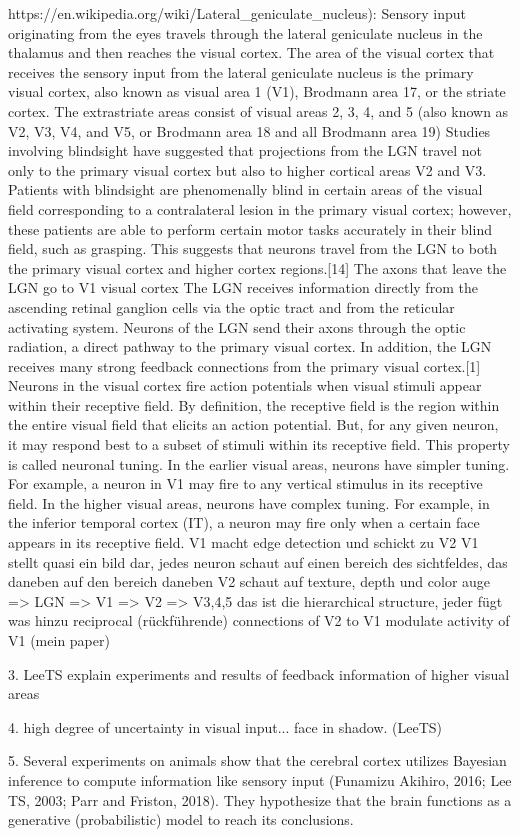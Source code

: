 https://en.wikipedia.org/wiki/Lateral_geniculate_nucleus):
 Sensory input originating from the eyes travels through the lateral geniculate nucleus in the thalamus and then reaches the visual cortex. The area of the visual cortex that receives the sensory input from the lateral geniculate nucleus is the primary visual cortex, also known as visual area 1 (V1), Brodmann area 17, or the striate cortex. The extrastriate areas consist of visual areas 2, 3, 4, and 5 (also known as V2, V3, V4, and V5, or Brodmann area 18 and all Brodmann area 19)
 Studies involving blindsight have suggested that projections from the LGN travel not only to the primary visual cortex but also to higher cortical areas V2 and V3. Patients with blindsight are phenomenally blind in certain areas of the visual field corresponding to a contralateral lesion in the primary visual cortex; however, these patients are able to perform certain motor tasks accurately in their blind field, such as grasping. This suggests that neurons travel from the LGN to both the primary visual cortex and higher cortex regions.[14]
The axons that leave the LGN go to V1 visual cortex
The LGN receives information directly from the ascending retinal ganglion cells via the optic tract and from the reticular activating system. Neurons of the LGN send their axons through the optic radiation, a direct pathway to the primary visual cortex. In addition, the LGN receives many strong feedback connections from the primary visual cortex.[1]
 Neurons in the visual cortex fire action potentials when visual stimuli appear within their receptive field.
By definition, the receptive field is the region within the entire visual field that elicits an action potential. But, for any given neuron, it may respond best to a subset of stimuli within its receptive field. This property is called neuronal tuning. In the earlier visual areas, neurons have simpler tuning. For example, a neuron in V1 may fire to any vertical stimulus in its receptive field. In the higher visual areas, neurons have complex tuning. For example, in the inferior temporal cortex (IT), a neuron may fire only when a certain face appears in its receptive field.
V1 macht edge detection und schickt zu V2
V1 stellt quasi ein bild dar, jedes neuron schaut auf einen bereich des sichtfeldes, das daneben auf den bereich daneben
V2 schaut auf texture, depth und color
auge => LGN => V1 => V2 => V3,4,5
das ist die hierarchical structure, jeder fügt was hinzu
 reciprocal (rückführende) connections of V2 to V1 modulate activity of V1 (mein paper)

3. LeeTS explain experiments and results of feedback information of higher visual areas

4. high degree of uncertainty in visual input... face in shadow. (LeeTS)

5. Several experiments on animals show that the cerebral
cortex utilizes Bayesian inference to compute information like sensory
input (Funamizu Akihiro, 2016; Lee TS, 2003; Parr and Friston, 2018). They
hypothesize that the brain functions as a generative (probabilistic) model
to reach its conclusions. 

